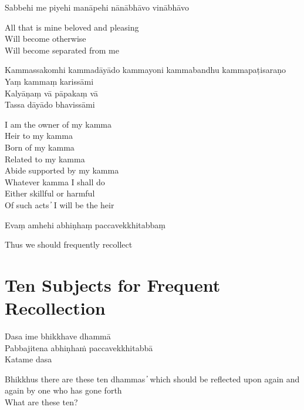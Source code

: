 Sabbehi me piyehi manāpehi nānābhāvo vinābhāvo

\begin{english}
  All that is mine beloved and pleasing\\
  Will become otherwise\\
  Will become separated from me
\end{english}

Kammassakomhi kammadāyādo kammayoni kammabandhu kammapaṭisaraṇo\\
Yaṃ kammaṃ karissāmi\\
Kalyāṇaṃ vā pāpakaṃ vā\\
Tassa dāyādo bhavissāmi

\begin{english}
  I am the owner of my kamma\\
  Heir to my kamma\\
  Born of my kamma\\
  Related to my kamma\\
  Abide supported by my kamma\\
  Whatever kamma I shall do\\
  Either skillful or harmful\\
  Of such acts  ̓  I will be the heir
\end{english}

Evaṃ amhehi abhiṇhaṃ paccavekkhitabbaṃ

\begin{english}
  Thus we should frequently recollect
\end{english}


\clearpage

\section{Ten Subjects for Frequent Recollection}

\begin{leader}
\end{leader}

Dasa ime bhikkhave dhammā\\
Pabbajitena abhiṇhaṁ paccavekkhitabbā\\
Katame dasa

\begin{english}
  Bhikkhus there are these ten dhammas  ̓  which should be reflected upon again and again by one who has gone forth\\
  What are these ten?
\end{english}

